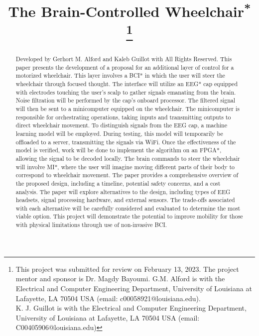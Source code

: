 \documentclass[conference]{IEEEtran}
\begin{document}
\title{The Brain-Controlled Wheelchair{\footnotesize \textsuperscript{*}}
\thanks{This project was submitted for review on February 13, 2023. The project mentor and sponsor is Dr. Magdy Bayoumi. G.M. Alford is with the Electrical and Computer Engineering Department, University of Louisiana at Lafayette, LA 70504 USA (email: c00058921@louisiana.edu).\\K. J. Guillot is with the Electrical and Computer Engineering Department, University of Louisiana at Lafayette, LA 70504 USA (email: C00405906@louisiana.edu)}
}
\author{

}

\maketitle
\thispagestyle{plain}
\pagestyle{plain}
\vspace{-7mm}

\begin{abstract}
Developed by Gerhort M. Alford and Kaleb Guillot with All Rights Reserved. This paper presents the development of a proposal for an additional layer of control for a motorized wheelchair. This layer involves a BCI* in which the user will steer the wheelchair through focused thought. The interface will utilize an EEG* cap equipped with electrodes touching the user's scalp to gather signals emanating from the brain. Noise filtration will be performed by the cap's onboard processor. The filtered signal will then be sent to a minicomputer equipped on the wheelchair. The minicomputer is responsible for orchestrating operations, taking inputs and transmitting outputs to direct wheelchair movement. To distinguish signals from the EEG cap, a machine learning model will be employed. During testing, this model will temporarily be offloaded to a server, transmitting the signals via WiFi. Once the effectiveness of the model is verified, work will be done to implement the algorithm on an FPGA*, allowing the signal to be decoded locally. The brain commands to steer the wheelchair will involve MI*, where the user will imagine moving different parts of their body to correspond to wheelchair movement. The paper provides a comprehensive overview of the proposed design, including a timeline, potential safety concerns, and a cost analysis. The paper will explore alternatives to the design, including types of EEG headsets, signal processing hardware, and external sensors. The trade-offs associated with each alternative will be carefully considered and evaluated to determine the most viable option. This project will demonstrate the potential to improve mobility for those with physical limitations through use of non-invasive BCI.
\end{abstract}
\end{document}
